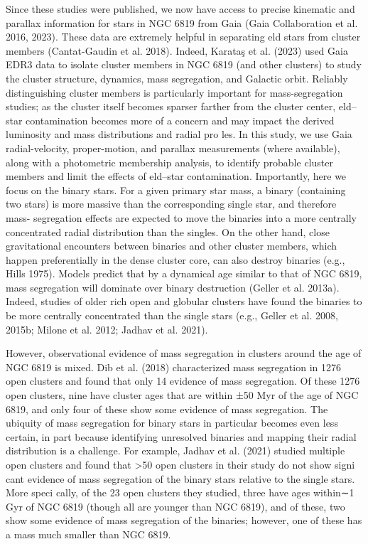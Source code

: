 \documentclass[../Main.tex]{subfiles}
\begin{document}
{Since these studies were published, we now have access to
precise kinematic and parallax information for stars in NGC
6819 from Gaia (Gaia Collaboration et al. 2016, 2023). These
data are extremely helpful in separating eld stars from cluster
members (Cantat-Gaudin et al. 2018). Indeed, Karataş et al.
(2023) used Gaia EDR3 data to isolate cluster members in
NGC 6819 (and other clusters) to study the cluster structure,
dynamics, mass segregation, and Galactic orbit. Reliably
distinguishing cluster members is particularly important for
mass-segregation studies; as the cluster itself becomes sparser
farther from the cluster center, eld–star contamination
becomes more of a concern and may impact the derived
luminosity and mass distributions and radial pro les. In this
study, we use Gaia radial-velocity, proper-motion, and parallax
measurements (where available), along with a photometric
membership analysis, to identify probable cluster members and
limit the effects of eld–star contamination.
Importantly, here we focus on the binary stars. For a given
primary star mass, a binary (containing two stars) is more
massive than the corresponding single star, and therefore mass-
segregation effects are expected to move the binaries into a more
centrally concentrated radial distribution than the singles. On the
other hand, close gravitational encounters between binaries and
other cluster members, which happen preferentially in the dense cluster core, can also destroy binaries (e.g., Hills 1975). Models
predict that by a dynamical age similar to that of NGC 6819,
mass segregation will dominate over binary destruction (Geller
et al. 2013a). Indeed, studies of older rich open and globular
clusters have found the binaries to be more centrally
concentrated than the single stars (e.g., Geller et al. 2008,
2015b; Milone et al. 2012; Jadhav et al. 2021).

However, observational evidence of mass segregation in
clusters around the age of NGC 6819 is mixed. Dib et al.
(2018) characterized mass segregation in 1276 open clusters
and found that only 14%
evidence of mass segregation. Of these 1276 open clusters,
nine have cluster ages that are within ±50 Myr of the age of
NGC 6819, and only four of these show some evidence of mass
segregation. The ubiquity of mass segregation for binary stars
in particular becomes even less certain, in part because
identifying unresolved binaries and mapping their radial
distribution is a challenge. For example, Jadhav et al. (2021)
studied multiple open clusters and found that >50%
open clusters in their study do not show signi cant evidence of
mass segregation of the binary stars relative to the single stars.
More speci cally, of the 23 open clusters they studied, three
have ages within∼1 Gyr of NGC 6819 (though all are younger
than NGC 6819), and of these, two show some evidence of
mass segregation of the binaries; however, one of these has a
mass much smaller than NGC 6819. 

}
\end{document}
